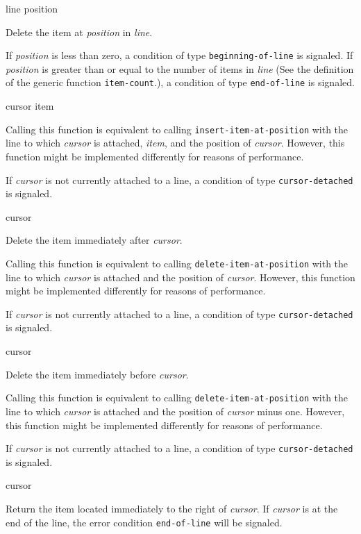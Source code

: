  {line position}

Delete the item at \textit{position} in \textit{line}.

If \textit{position} is less than zero, a condition of type
\texttt{beginning-of-line} is signaled.  If \textit{position} is
greater than or equal to the number of items in \textit{line} (See the
definition of the generic function \texttt{item-count}.), a condition
of type \texttt{end-of-line} is signaled.

 {cursor item}

Calling this function is equivalent to calling
\texttt{insert-item-at-position} with the line to which
\textit{cursor} is attached, \textit{item}, and the position of
\textit{cursor}.  However, this function might be implemented
differently for reasons of performance.

If \textit{cursor} is not currently attached to a line, a condition
of type \texttt{cursor-detached} is signaled.

 {cursor}

Delete the item immediately after \emph{cursor}.

Calling this function is equivalent to calling
\texttt{delete-item-at-position} with the line to which
\textit{cursor} is attached and the position of \textit{cursor}.
However, this function might be implemented differently for reasons of
performance.

If \textit{cursor} is not currently attached to a line, a condition
of type \texttt{cursor-detached} is signaled.

 {cursor}

Delete the item immediately before \emph{cursor}.

Calling this function is equivalent to calling
\texttt{delete-item-at-position} with the line to which
\textit{cursor} is attached and the position of \textit{cursor} minus
one.  However, this function might be implemented differently for
reasons of performance.

If \textit{cursor} is not currently attached to a line, a condition
of type \texttt{cursor-detached} is signaled.

 {cursor}

Return the item located immediately to the right of \textit{cursor}.
If \emph{cursor} is at the end of the line, the error condition
\texttt{end-of-line} will be signaled.

